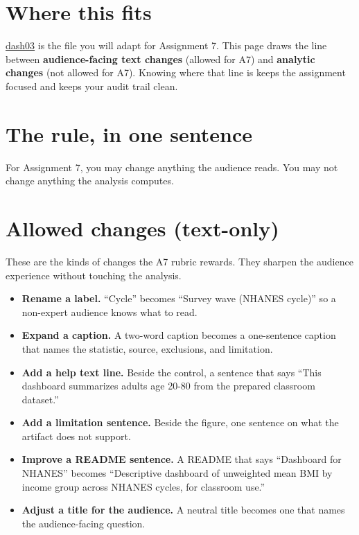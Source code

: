 \documentclass[
  letterpaper,
  DIV=11,
  numbers=noendperiod,
  oneside]{scrreprt}
\providecommand{\tightlist}{%
  \setlength{\itemsep}{0pt}\setlength{\parskip}{0pt}}
\begin{document}

\section*{Where this fits}\label{where-this-fits-14}


\hyperref[starter-dashboard]{dash03} is the file you will adapt for
Assignment 7. This page draws the line between \textbf{audience-facing
text changes} (allowed for A7) and \textbf{analytic changes} (not
allowed for A7). Knowing where that line is keeps the assignment focused
and keeps your audit trail clean.

\section*{The rule, in one sentence}\label{the-rule-in-one-sentence}


For Assignment 7, you may change anything the audience reads. You may
not change anything the analysis computes.

\section*{Allowed changes (text-only)}\label{allowed-changes-text-only}


These are the kinds of changes the A7 rubric rewards. They sharpen the
audience experience without touching the analysis.

\begin{itemize}
\tightlist
\item
  \textbf{Rename a label.} ``Cycle'' becomes ``Survey wave (NHANES
  cycle)'' so a non-expert audience knows what to read.
\item
  \textbf{Expand a caption.} A two-word caption becomes a one-sentence
  caption that names the statistic, source, exclusions, and limitation.
\item
  \textbf{Add a help text line.} Beside the control, a sentence that
  says ``This dashboard summarizes adults age 20-80 from the prepared
  classroom dataset.''
\item
  \textbf{Add a limitation sentence.} Beside the figure, one sentence on
  what the artifact does not support.
\item
  \textbf{Improve a README sentence.} A README that says ``Dashboard for
  NHANES'' becomes ``Descriptive dashboard of unweighted mean BMI by
  income group across NHANES cycles, for classroom use.''
\item
  \textbf{Adjust a title for the audience.} A neutral title becomes one
  that names the audience-facing question.
\end{itemize}
\end{document}
